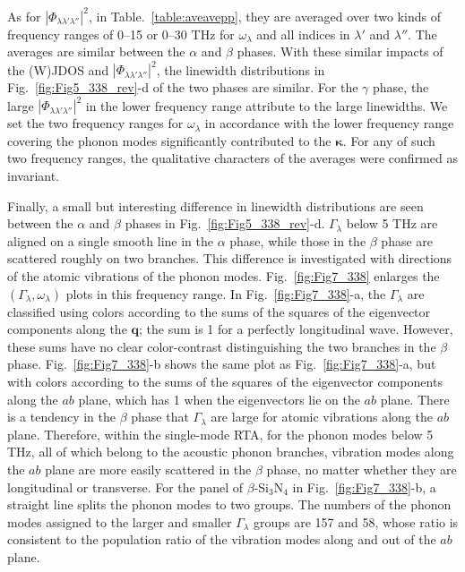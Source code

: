 \documentclass[twocolumn,amsmath,amssymb,a4paper,prb,superscriptaddress,floatfix]{revtex4-1}
\begin{document}
As for $|\Phi_{\lambda\lambda'\lambda''}|^2$, in Table.~\ref{table:aveavepp},
they are averaged over two kinds of frequency ranges of 0--15 or 0--30 THz for
$\omega_\lambda$ and all indices in $\lambda'$ and $\lambda''$.  The averages
are similar between the $\alpha$ and $\beta$ phases. With these similar impacts
of the (W)JDOS and $|\Phi_{\lambda\lambda'\lambda''}|^2$, the linewidth
distributions in Fig.~\ref{fig:Fig5_338_rev}-d of the two phases are similar.
For the $\gamma$ phase, the large $|\Phi_{\lambda\lambda'\lambda''}|^2$ in the
lower frequency range attribute to the large linewidths.  We set the two
frequency ranges for $\omega_\lambda$ in accordance with the lower frequency
range covering the phonon modes significantly contributed to the
$\boldsymbol{\kappa}$. For any of such two frequency ranges, the qualitative
characters of the averages were confirmed as invariant.  

Finally, a small but interesting difference in linewidth distributions are seen
between the $\alpha$ and $\beta$ phases in Fig.~\ref{fig:Fig5_338_rev}-d.
$\Gamma_\lambda$ below 5 THz are aligned on a single smooth line in the $\alpha$
phase, while those in the $\beta$ phase are scattered roughly on two branches.
This difference is investigated with directions of the atomic vibrations of the
phonon modes. Fig.~\ref{fig:Fig7_338} enlarges the
$(\Gamma_\lambda,\omega_\lambda)$ plots in this frequency range. In
Fig.~\ref{fig:Fig7_338}-a, the $\Gamma_\lambda$ are classified using colors
according to the sums of the squares of the eigenvector components along the
$\mathbf{q}$; the sum is 1 for a perfectly longitudinal wave. However, these
sums have no clear color-contrast distinguishing the two branches in the $\beta$
phase.  Fig.~\ref{fig:Fig7_338}-b shows the same plot as
Fig.~\ref{fig:Fig7_338}-a, but with colors according to the sums of the squares
of the eigenvector components along the $ab$ plane, which has 1 when the
eigenvectors lie on the $ab$ plane. There is a tendency in the $\beta$ phase
that  $\Gamma_\lambda$ are large for atomic vibrations along the $ab$ plane.
Therefore, within the single-mode RTA, for the phonon modes below 5 THz, all of
which belong to the acoustic phonon branches, vibration modes along the $ab$
plane are more easily scattered in the $\beta$ phase, no matter whether they are
longitudinal or transverse. For the panel of $\beta$-Si$_3$N$_4$ in
Fig.~\ref{fig:Fig7_338}-b, a straight line splits the phonon modes to two
groups. The numbers of the phonon modes assigned to the larger and smaller
$\Gamma_\lambda$ groups are 157 and 58, whose ratio is consistent to the
population ratio of the vibration modes along and out of the $ab$ plane.
\end{document}
